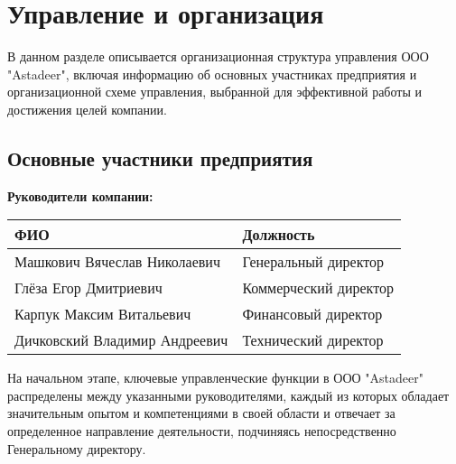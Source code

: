     \section{Управление и организация}

    В данном разделе описывается организационная структура управления ООО "Astadeer", включая информацию об основных участниках предприятия и организационной схеме управления, выбранной для эффективной работы и достижения целей компании.

    \subsection{Основные участники предприятия}

    {\Large \textbf{Руководители компании:} \par} %
    \vspace{0.2cm}

    \begin{center} %
    \begin{tabular}{ll} %
        \textbf{ФИО} & \textbf{Должность} \\ %
        \hline
        Машкович Вячеслав Николаевич & Генеральный директор \\
        Глёза Егор Дмитриевич & Коммерческий директор \\
        Карпук Максим Витальевич & Финансовый директор \\
        Дичковский Владимир Андреевич & Технический директор \\
    \end{tabular}
    \end{center}
    \vspace{1.5cm}

    На начальном этапе, ключевые управленческие функции в ООО "Astadeer" распределены между указанными руководителями, каждый из которых обладает значительным опытом и компетенциями в своей области и отвечает за определенное направление деятельности, подчиняясь непосредственно Генеральному директору.

